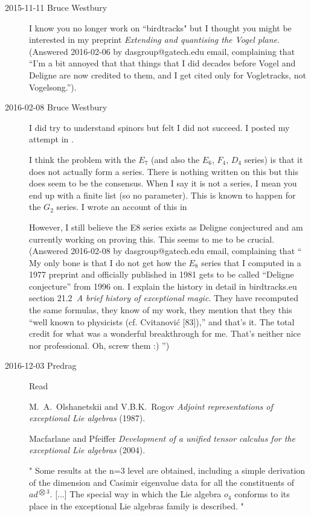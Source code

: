 \begin{description}
\item[2015-11-11 Bruce Westbury]
I know you no longer work on ``birdtracks" but I thought you might be
interested in my preprint {\em Extending and quantising
the Vogel plane}. \\
(Answered 2016-02-06 by dasgroup@gatech.edu email,
complaining that ``I'm a bit annoyed that that things that I did decades
before Vogel and Deligne are now credited to them, and I get cited only
for Vogletracks, not Vogelsong.'').

\item[2016-02-08 Bruce Westbury]
I did try to understand spinors but felt I did not succeed. I posted my
attempt in .

I think the problem with the $E_7$ (and also the $E_6$, $F_4$, $D_4$ series) is that
it does not actually form a series. There is nothing written on this but
this does seem to be the consensus. When I say it is not a series, I
mean you end up with a finite list (so no parameter). This is known to
happen for the $G_2$ series. I wrote an account of this in

However, I still believe the E8 series exists as Deligne conjectured and
am currently working on proving this. This seems to me to be crucial.
\\
(Answered 2016-02-08 by dasgroup@gatech.edu email,
complaining that ``
My only bone is that I do not get how the $E_8$ series that I computed in
a 1977 preprint and officially published in 1981 gets to be called
``Deligne conjecture'' from 1996 on. I explain the history in detail in
birdtracks.eu section 21.2~{\em A brief history of exceptional magic}. They
have recomputed the same formulas, they know of my work, they mention
that they this ``well known to physicists (cf. Cvitanovi{\'c} [83]),'' and
that's it. The total credit for what was a wonderful breakthrough for me.
That's neither nice nor professional. Oh, screw them :)
'')


\item[2016-12-03 Predrag]
Read

M.~A.~Olshanetskii and V.B.K.~Rogov
{\em Adjoint representations of exceptional Lie algebras} (1987).

Macfarlane and Pfeiffer
{\em Development of a unified tensor calculus for the exceptional {Lie} 
algebras} (2004). 

"
Some results at the n=3 level are obtained, including a simple derivation 
of the dimension and Casimir eigenvalue data for all the constituents of 
$ad^{\bigotimes3}$.
[...] 
The special way in which the Lie algebra $o_4$ conforms to its place in the  
exceptional Lie algebras family is described.
"


\end{description}
